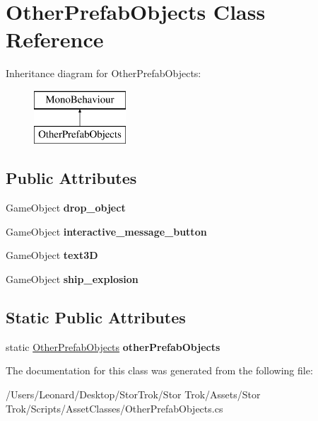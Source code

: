 \hypertarget{class_other_prefab_objects}{}\section{Other\+Prefab\+Objects Class Reference}
\label{class_other_prefab_objects}
Inheritance diagram for Other\+Prefab\+Objects\+:\begin{figure}[H]
\begin{center}
\leavevmode
\includegraphics[height=2.000000cm]{class_other_prefab_objects}
\end{center}
\end{figure}
\subsection*{Public Attributes}
\begin{DoxyCompactItemize}
\item 
\mbox{\label{class_other_prefab_objects_a9ef93f4ba771a8d4b231425bd9a62cf8}} 
Game\+Object {\bfseries drop\+\_\+object}
\item 
\mbox{\label{class_other_prefab_objects_a8a304d25560256bd1c78268c968b3c88}} 
Game\+Object {\bfseries interactive\+\_\+message\+\_\+button}
\item 
\mbox{\label{class_other_prefab_objects_a12043ad62ab00a21487a5ab5b270795e}} 
Game\+Object {\bfseries text3D}
\item 
\mbox{\label{class_other_prefab_objects_a180d4e030b4bac7db1220dcf227812d4}} 
Game\+Object {\bfseries ship\+\_\+explosion}
\end{DoxyCompactItemize}
\subsection*{Static Public Attributes}
\begin{DoxyCompactItemize}
\item 
\mbox{\label{class_other_prefab_objects_aa8c46bf0e16934c4a5d4a9cfc8b57c3f}} 
static \hyperlink{class_other_prefab_objects}{Other\+Prefab\+Objects} {\bfseries other\+Prefab\+Objects}
\end{DoxyCompactItemize}


The documentation for this class was generated from the following file\+:\begin{DoxyCompactItemize}
\item 
/\+Users/\+Leonard/\+Desktop/\+Stor\+Trok/\+Stor Trok/\+Assets/\+Stor Trok/\+Scripts/\+Asset\+Classes/Other\+Prefab\+Objects.\+cs\end{DoxyCompactItemize}
